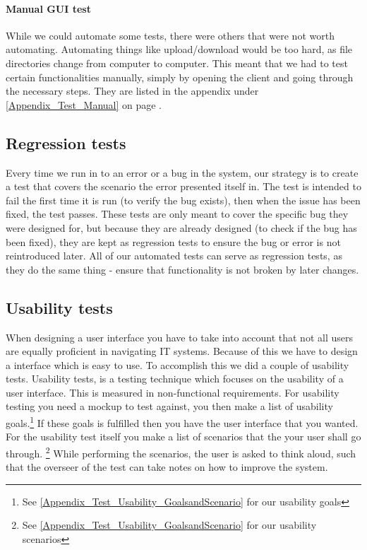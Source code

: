 \paragraph{Manual GUI test}
While we could automate some tests, there were others that were not worth automating. Automating things like upload/download would be too hard, as file directories change from computer to computer. This meant that we had to test certain functionalities manually, simply by opening the client and going through the necessary steps. They are listed in the appendix under \ref{Appendix_Test_Manual} on page \pageref{Appendix_Test_Manual}.

\subsection{Regression tests}
\label{Testing_Strategy_Regression}
Every time we run in to an error or a bug in the system, our strategy is to create a test that covers the scenario the error presented itself in. The test is intended to fail the first time it is run (to verify the bug exists), then when the issue has been fixed, the test passes. 
These tests are only meant to cover the specific bug they were designed for, but because they are already designed (to check if the bug has been fixed), they are kept as regression tests to ensure the bug or error is not reintroduced later. All of our automated tests can serve as regression tests, as they do the same thing - ensure that functionality is not broken by later changes.

\subsection{Usability tests}
\label{Testing_Strategy_Usability}
When designing a user interface you have to take into account that not all users are equally proficient in navigating IT systems. Because of this we have to design a interface which is easy to use. To accomplish this we did a couple of usability tests. Usability tests, is a testing technique which focuses on the usability of a user interface. This is measured in non-functional requirements. For usability testing you need a mockup to test against, you then make a list of usability goals.\footnote{See \ref{Appendix_Test_Usability_GoalsandScenario} for our usability goals} If these goals is fulfilled then you have the user interface that you wanted. For the usability test itself you make a list of scenarios that the your user shall go through. \footnote{See \ref{Appendix_Test_Usability_GoalsandScenario} for our usability scenarios} While performing the scenarios, the user is asked to think aloud, such that the overseer of the test can take notes on how to improve the system.

